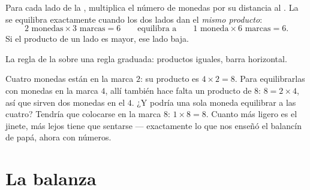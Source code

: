 \begin{proposition}\label{prop:g3:levers-and-scales:rule}
Para cada lado de la , multiplica el número de monedas por su
distancia al . La  se equilibra exactamente
cuando los dos lados dan el \emph{mismo producto}:
\[
2 \text{ monedas} \times 3 \text{ marcas} = 6
\qquad\text{equilibra a}\qquad
1 \text{ moneda} \times 6 \text{ marcas} = 6 .
\]
Si el producto de un lado es mayor, ese lado baja.
\end{proposition}

\begin{omfigure}

{\small La regla de la  sobre una regla graduada: productos
iguales, barra horizontal.}
\end{omfigure}

\begin{example}\label{ex:g3:levers-and-scales:using}
Cuatro monedas están en la marca $2$: su producto es $4 \times 2 = 8$.
Para equilibrarlas con monedas en la marca $4$, allí también hace
falta un producto de $8$: $8 = 2 \times 4$, así que sirven dos monedas
en el $4$. ¿Y podría una sola moneda equilibrar a las cuatro? Tendría
que colocarse en la marca $8$: $1 \times 8 = 8$. Cuanto más ligero es
el jinete, más lejos tiene que sentarse --- exactamente lo que nos
enseñó el balancín de papá, ahora con números.
\end{example}

\section{La balanza}

